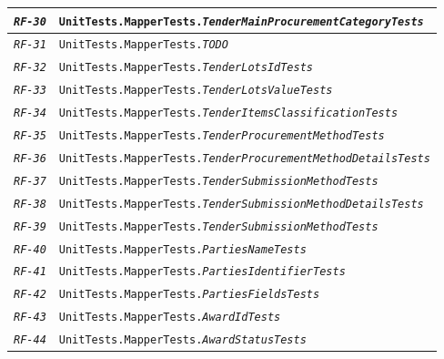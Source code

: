 \begin{longtable}{|| M{3cm} | M{12cm} ||}
                \hline
                    \texttt{\textit{RF-30}} & \texttt{UnitTests.MapperTests.\textit{TenderMainProcurementCategoryTests}} \\
                \hline
                    \texttt{\textit{RF-31}} & \texttt{UnitTests.MapperTests.\textit{TODO}} \\
                \hline
                    \texttt{\textit{RF-32}} & \texttt{UnitTests.MapperTests.\textit{TenderLotsIdTests}} \\
                \hline
                    \texttt{\textit{RF-33}} & \texttt{UnitTests.MapperTests.\textit{TenderLotsValueTests}} \\
                \hline
                    \texttt{\textit{RF-34}} & \texttt{UnitTests.MapperTests.\textit{TenderItemsClassificationTests}} \\
                \hline
                    \texttt{\textit{RF-35}} & \texttt{UnitTests.MapperTests.\textit{TenderProcurementMethodTests}} \\
                \hline
                    \texttt{\textit{RF-36}} & \texttt{UnitTests.MapperTests.\textit{TenderProcurementMethodDetailsTests}} \\
                \hline
                    \texttt{\textit{RF-37}} & \texttt{UnitTests.MapperTests.\textit{TenderSubmissionMethodTests}} \\
                \hline
                    \texttt{\textit{RF-38}} & \texttt{UnitTests.MapperTests.\textit{TenderSubmissionMethodDetailsTests}} \\
                \hline
                    \texttt{\textit{RF-39}} & \texttt{UnitTests.MapperTests.\textit{TenderSubmissionMethodTests}} \\
                \hline
                    \texttt{\textit{RF-40}} & \texttt{UnitTests.MapperTests.\textit{PartiesNameTests}} \\
                \hline
                    \texttt{\textit{RF-41}} & \texttt{UnitTests.MapperTests.\textit{PartiesIdentifierTests}} \\
                \hline
                    \texttt{\textit{RF-42}} & \texttt{UnitTests.MapperTests.\textit{PartiesFieldsTests}} \\
                \hline
                    \texttt{\textit{RF-43}} & \texttt{UnitTests.MapperTests.\textit{AwardIdTests}} \\
                \hline
                    \texttt{\textit{RF-44}} & \texttt{UnitTests.MapperTests.\textit{AwardStatusTests}} \\

\end{longtable}
